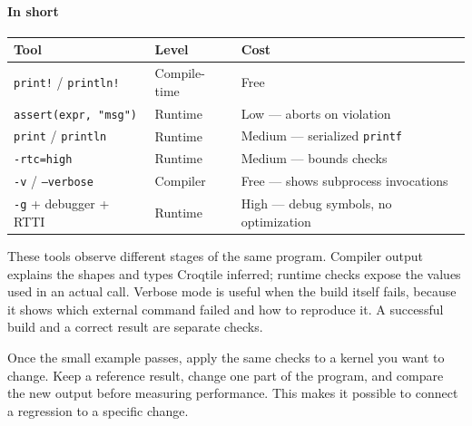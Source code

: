 \paragraph*{In short}

\begin{table}[htbp]
\centering\small
\begin{tabularx}{\linewidth}{@{}lXX@{}}
\toprule
\textbf{Tool} & \textbf{Level} & \textbf{Cost} \\
\midrule
\texttt{print!} / \texttt{println!} & Compile-time & Free \\
\texttt{assert(expr, "msg")} & Runtime & Low --- aborts on violation \\
\texttt{print} / \texttt{println} & Runtime & Medium --- serialized \texttt{printf} \\
\texttt{-rtc=high} & Runtime & Medium --- bounds checks \\
\texttt{-v} / \texttt{--verbose} & Compiler & Free --- shows subprocess invocations \\
\texttt{-g} + debugger + RTTI & Runtime & High --- debug symbols, no optimization \\
\bottomrule
\end{tabularx}
\end{table}

These tools observe different stages of the same program. Compiler output explains the shapes and types Croqtile inferred; runtime checks expose the values used in an actual call. Verbose mode is useful when the build itself fails, because it shows which external command failed and how to reproduce it. A successful build and a correct result are separate checks.

Once the small example passes, apply the same checks to a kernel you want to change. Keep a reference result, change one part of the program, and compare the new output before measuring performance. This makes it possible to connect a regression to a specific change.

